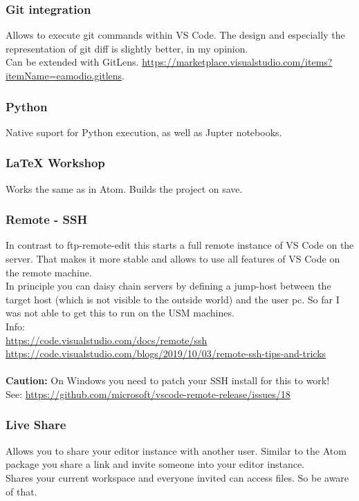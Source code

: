 \documentclass[10pt,a4paper]{article}
\begin{document}
\subsubsection{Git integration}
Allows to execute git commands within VS Code. The design and especially the representation of git diff is slightly better, in my opinion.\\
Can be extended with GitLens. \url{https://marketplace.visualstudio.com/items?itemName=eamodio.gitlens}.

\subsubsection{Python}
Native suport for Python execution, as well as Jupter notebooks.

\subsubsection{LaTeX Workshop}
Works the same as in Atom. Builds the project on save.

\subsubsection{Remote - SSH}
In contrast to ftp-remote-edit this starts a full remote instance of VS Code on the server. That makes it more stable and allows to use all features of VS Code on the remote machine.\\
In principle you can daisy chain servers by defining a jump-host between the target host (which is not visible to the outside world) and the user pc. So far I was not able to get this to run on the USM machines.\\
Info:\\
\url{https://code.visualstudio.com/docs/remote/ssh}\\
\url{https://code.visualstudio.com/blogs/2019/10/03/remote-ssh-tips-and-tricks}\\
\\
\textbf{Caution:} On Windows you need to patch your SSH install for this to work!\\
See: \url{https://github.com/microsoft/vscode-remote-release/issues/18}

\subsubsection{Live Share}
Allows you to share your editor instance with another user. Similar to the Atom package you share a link and invite someone into your editor instance.\\
Shares your current workspace and everyone invited can access files. So be aware of that. 
\end{document}
